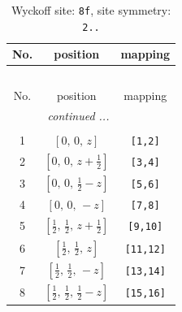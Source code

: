 \documentclass[fleqn,8pt]{jsarticle}
\begin{document}
\begin{longtable}{ccc}
\caption{Wyckoff site: {\tt 8f}, site symmetry: {\tt 2..}}
 \\
 \hline \hline
No. & position & mapping \\ \hline \endfirsthead

\multicolumn{2}{l}{\tablename\ \thetable{}} \\
 \hline \hline
No. & position & mapping \\ \hline \endhead

 \hline \hline
\multicolumn{2}{r}{\footnotesize\it continued ...} \\ \endfoot

 \hline \hline
\multicolumn{2}{r}{} \\ \endlastfoot

1 & $\left[ 0,\, 0,\, z \right]$ & {\tt [1,2]} \\ \hline
2 & $\left[ 0,\, 0,\, z + \frac{1}{2} \right]$ & {\tt [3,4]} \\ \hline
3 & $\left[ 0,\, 0,\, \frac{1}{2} - z \right]$ & {\tt [5,6]} \\ \hline
4 & $\left[ 0,\, 0,\, - z \right]$ & {\tt [7,8]} \\ \hline
5 & $\left[ \frac{1}{2},\, \frac{1}{2},\, z + \frac{1}{2} \right]$ & {\tt [9,10]} \\ \hline
6 & $\left[ \frac{1}{2},\, \frac{1}{2},\, z \right]$ & {\tt [11,12]} \\ \hline
7 & $\left[ \frac{1}{2},\, \frac{1}{2},\, - z \right]$ & {\tt [13,14]} \\ \hline
8 & $\left[ \frac{1}{2},\, \frac{1}{2},\, \frac{1}{2} - z \right]$ & {\tt [15,16]} \\
\end{longtable}
\renewcommand{\arraystretch}{1.2}
\end{document}
